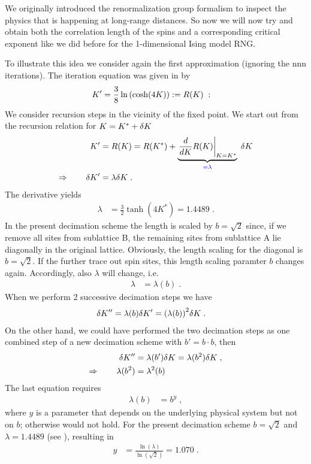 We originally introduced the renormalization group formalism to inspect the physics that is happening at long-range distances. So now we will now try and obtain both the correlation length of the spins and a corresponding critical exponent like we did before for the 1-dimensional Ising model RNG.

To illustrate this idea we consider again the first approximation (ignoring the nnn
iterations). The iteration equation  was given in
 by
%
\begin{align*}
K' &= \frac{3}{8} \ln\qty( \cosh(4K)  ) := R(K)\;:
\end{align*}
%
We consider recursion steps in the vicinity of the fixed point.
We start out from the recursion relation for $K = K^{*}+\var K$
%
\begin{align*}
K' &= R(K) =R(K^{*}) + \underbrace{
\eval{\frac{d}{dK} R(K)}_{K=K^{*}}
}_{\color{blue} = \lambda}\;\var K\\
\Rightarrow\qquad \var K' &= \lambda \var K\;.
\end{align*}
%
The derivative yields
\begin{align}\label{eq:lambda}
\lambda &= \frac{3}{2} \tanh(4 K^{*}) = 1.4489\;.
\end{align}
%
In the present decimation scheme the length is scaled by $b=\sqrt{2}$ since, if we remove all sites from sublattice B, the remaining sites from sublattice A lie diagonally in the original lattice. Obviously, the length scaling for the diagonal is $b=\sqrt{2}$. If the further trace out spin sites, this length scaling paramter $b$ changes again. Accordingly, also $\lambda$ will change, i.e.
%
\begin{align*}
\lambda &= \lambda(b)\;.
\end{align*}
%
When we perform 2 successive decimation steps  we have 
%
\begin{align*}
\var K'' &=\lambda(b) \var K' = \qty(\lambda(b))^{2} \var K\;.
\end{align*}
%
On the other hand, we could have performed the two decimation steps as one combined step of a new decimation scheme with $b'=b\cdot b$, then
%
\begin{align}
\var K'' &=\lambda(b') \var K = \lambda(b^2) \var K\;,\nonumber \\
\Rightarrow\qquad \lambda(b^{2}) &= \lambda^{2}(b)\;\label{eq:RG:b}
\end{align}
%
The last equation requires
%
\begin{align*}
\lambda(b) &= b^{y}\;,
\end{align*}
%
where $y$ is a parameter that depends on the underlying physical system but not on $b$;
otherwise  would not hold. For the present decimation scheme $b=\sqrt{2}$ and 
$\lambda=1.4489$ (see ), resulting in 
%
\begin{align}\label{eq:2d:rng:y}
y &= \frac{\ln(\lambda)}{\ln(\sqrt{2})} = 1.070\;.
\end{align}
%


